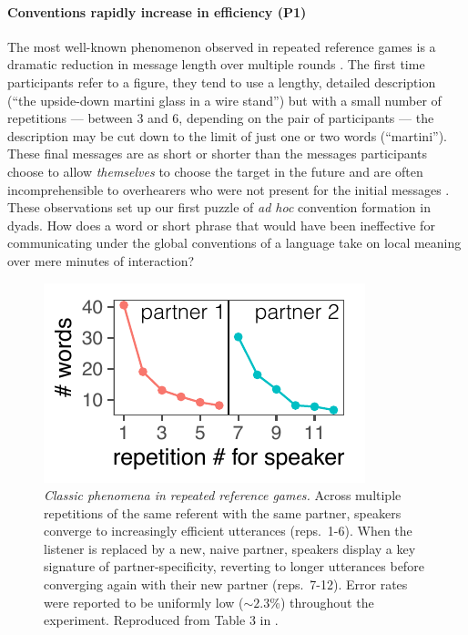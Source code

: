 \paragraph{Conventions rapidly increase in efficiency (\textbf{P1})}

The most well-known phenomenon observed in repeated reference games is a dramatic reduction in message length over multiple rounds \cite{krauss_changes_1964, ClarkWilkesGibbs86_ReferringCollaborative, hawkins2020characterizing}. 
The first time participants refer to a figure, they tend to use a lengthy, detailed description (``the upside-down martini glass in a wire stand'') but with a small number of repetitions --- between 3 and 6, depending on the pair of participants --- the description may be cut down to the limit of just one or two words (``martini''). 
These final messages are as short or shorter than the messages participants choose to allow \emph{themselves} to choose the target in the future  \cite{FussellKrauss89_IntendedAudienceCommonGround} and are often incomprehensible to overhearers who were not present for the initial messages \cite{SchoberClark89_Overhearers}.
These observations set up our first puzzle of \emph{ad hoc} convention formation in dyads.
How does a word or short phrase that would have been ineffective for communicating under the global conventions of a language take on local meaning over mere minutes of interaction? 

\begin{figure}[t!]
\centering
\includegraphics[scale=1.2]{./figures/clark92}
\vspace{1em}
\caption{\textit{Classic phenomena in repeated reference games.} Across multiple repetitions of the same referent with the same partner, speakers converge to increasingly efficient utterances (reps.~1-6). When the listener is  replaced by a new, naive partner, speakers display a key signature of partner-specificity, reverting to longer utterances before converging again with their new partner (reps.~7-12). Error rates were reported to be uniformly low ($\sim 2.3\%$) throughout the experiment. Reproduced from Table 3 in \protect{}.}
\label{fig:clark92}
\end{figure}

